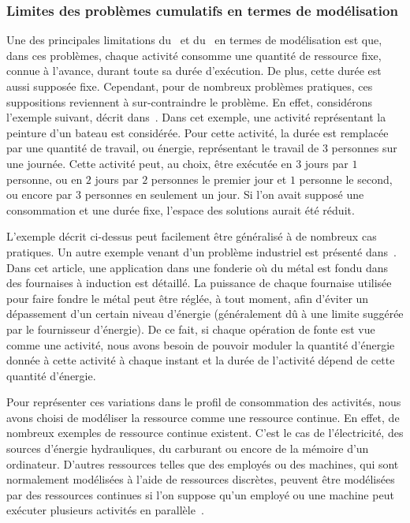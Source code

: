 \subsubsection{Limites des problèmes cumulatifs en termes de modélisation}
\label{sec:limit_CUSP}
Une des principales limitations du \CUSP~et du \RCPSP~en termes de
modélisation est que, dans
ces problèmes, chaque activité consomme une quantité de ressource
fixe, connue à l'avance, durant toute sa durée d'exécution. De plus,
cette durée est aussi supposée fixe. Cependant, pour de nombreux
problèmes pratiques, ces suppositions reviennent à sur-contraindre le
problème. En effet, considérons l'exemple suivant, décrit
dans~\cite{FT}.  Dans cet exemple, une activité représentant la
peinture d'un bateau est considérée. Pour cette activité, la durée est
remplacée par une quantité de travail, ou énergie, représentant le
travail de $3$ personnes sur une journée. Cette activité peut, au
choix, être exécutée en $3$ jours par $1$ personne, ou en $2$ jours
par $2$ personnes le premier jour et $1$ personne le second, ou encore
par $3$ personnes en seulement un jour. Si l'on avait supposé une
consommation et une durée fixe, l'espace des solutions aurait été
réduit.

L'exemple décrit ci-dessus peut facilement être généralisé à de
nombreux cas pratiques. Un autre exemple venant d'un problème
industriel est présenté dans~\cite{HaitArtiguesLopez}. Dans cet
article, une application dans une fonderie où du métal est fondu dans
des fournaises à induction est détaillé. La puissance de chaque
fournaise utilisée pour faire fondre le métal peut être réglée, à tout
moment, afin d'éviter un dépassement d'un certain niveau d'énergie
(généralement dû à une limite suggérée par le fournisseur
d'énergie). De ce fait, si chaque opération de fonte est vue comme une
activité, nous avons besoin de pouvoir moduler la quantité d'énergie
donnée à cette activité à chaque instant et la durée de l'activité
dépend de cette quantité d'énergie.

Pour représenter ces variations dans le profil de consommation des
activités, nous avons choisi de modéliser la ressource comme une
ressource continue. En effet, de nombreux exemples de ressource
continue existent. C'est le cas de l'électricité, des sources
d'énergie hydrauliques, du carburant ou encore de la mémoire d'un
ordinateur. D'autres ressources telles que des employés ou des
machines, qui sont normalement modélisées à l'aide de ressources
discrètes, peuvent être modélisées par des ressources continues si
l'on suppose qu'un employé ou une machine peut exécuter plusieurs
activités en parallèle~\cite{W80,NK}.

